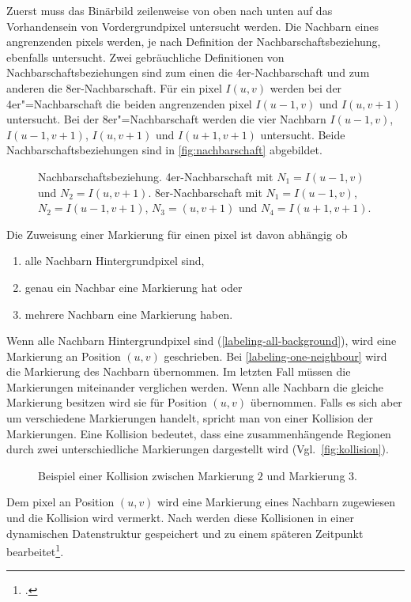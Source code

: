 Zuerst muss das Binärbild zeilenweise von oben nach unten auf das Vorhandensein von Vordergrundpixel untersucht werden.
Die Nachbarn eines angrenzenden \glspl{pixel} werden, je nach Definition der Nachbarschaftsbeziehung, ebenfalls
 untersucht. Zwei gebräuchliche Definitionen von Nachbarschaftsbeziehungen sind zum einen die 4er-Nachbarschaft und zum
 anderen die 8er-Nachbarschaft. Für ein \gls{pixel} $I(u,v)$ werden bei der 4er"=Nachbarschaft die beiden angrenzenden
 \gls{pixel} $I(u-1,v)$ und $I(u,v+1)$ untersucht. Bei der 8er"=Nachbarschaft werden die vier Nachbarn $I(u-1,v)$,
 $I(u-1,v+1)$, $I(u,v+1)$ und $I(u+1,v+1)$ untersucht. Beide Nachbarschaftsbeziehungen sind in
 \autoref{fig:nachbarschaft} abgebildet.
\begin{figure}[!ht]
	\centering
	\subfigure[]{
		\label{fig:4er-nachbarschaft}
		
	}
	\subfigure[]{
		\label{fig:8er-nachbarschaft}
		
	}
	\caption{Nachbarschaftsbeziehung.  4er-Nachbarschaft mit $N_1 = I(u-1,v)$ und
	 $N_2 = I(u,v+1)$.  8er-Nachbarschaft mit $N_1 = I(u-1,v)$, $N_2 = I(u-1,v+1)$,
	 $N_3 = (u,v+1)$ und $N_4 = I(u+1,v+1)$.}
	\label{fig:nachbarschaft}
\end{figure}
Die Zuweisung einer Markierung für einen \gls{pixel} ist davon abhängig ob
\begin{enumerate}
	\item alle Nachbarn Hintergrundpixel sind, \label{labeling-all-background}
	\item genau ein Nachbar eine Markierung hat oder \label{labeling-one-neighbour}
	\item mehrere Nachbarn eine Markierung haben. \label{labeling-many-neighbours}
\end{enumerate}

Wenn alle Nachbarn Hintergrundpixel sind (\autoref{labeling-all-background}), wird eine Markierung an Position $(u,v)$
 geschrieben. Bei \autoref{labeling-one-neighbour} wird die Markierung des Nachbarn übernommen. Im letzten Fall müssen
 die Markierungen miteinander verglichen werden. Wenn alle Nachbarn die gleiche Markierung besitzen wird sie für
 Position $(u,v)$ übernommen. Falls es sich aber um verschiedene Markierungen handelt, spricht man von einer Kollision
 der Markierungen. Eine Kollision bedeutet, dass eine zusammenhängende Regionen durch zwei unterschiedliche
 Markierungen dargestellt wird (Vgl.~\autoref{fig:kollision}).
\begin{figure}[!ht]
	\centering
	
	\caption{Beispiel einer Kollision zwischen Markierung $2$ und Markierung $3$.}
	\label{fig:kollision}
\end{figure}
Dem \gls{pixel} an Position $(u,v)$ wird eine Markierung eines Nachbarn zugewiesen und die Kollision wird vermerkt. Nach
 \citeauthor{burger05} werden diese Kollisionen in einer dynamischen Datenstruktur gespeichert und zu einem späteren
 Zeitpunkt bearbeitet\footcite[Vgl.][S.~203--204]{burger05}.

